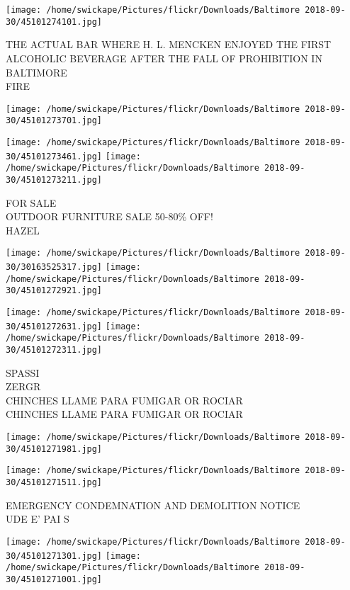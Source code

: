 \documentclass[10pt,letterpaper]{article}
\begin{document}
\vspace{0.25in}
\texttt{[image: /home/swickape/Pictures/flickr/Downloads/Baltimore 2018-09-30/45101274101.jpg]}

THE ACTUAL BAR WHERE H. L. MENCKEN ENJOYED THE FIRST ALCOHOLIC BEVERAGE AFTER THE FALL OF PROHIBITION IN BALTIMORE\\
FIRE\\
\pagebreak

\texttt{[image: /home/swickape/Pictures/flickr/Downloads/Baltimore 2018-09-30/45101273701.jpg]}

\vspace{0.25in}
\texttt{[image: /home/swickape/Pictures/flickr/Downloads/Baltimore 2018-09-30/45101273461.jpg]}
\texttt{[image: /home/swickape/Pictures/flickr/Downloads/Baltimore 2018-09-30/45101273211.jpg]}

FOR SALE\\
OUTDOOR FURNITURE SALE 50{-}80\% OFF!\\
HAZEL\\
\pagebreak

\texttt{[image: /home/swickape/Pictures/flickr/Downloads/Baltimore 2018-09-30/30163525317.jpg]}
\texttt{[image: /home/swickape/Pictures/flickr/Downloads/Baltimore 2018-09-30/45101272921.jpg]}

\texttt{[image: /home/swickape/Pictures/flickr/Downloads/Baltimore 2018-09-30/45101272631.jpg]}
\texttt{[image: /home/swickape/Pictures/flickr/Downloads/Baltimore 2018-09-30/45101272311.jpg]}

SPASSI\\
ZERGR\\
CHINCHES LLAME PARA FUMIGAR OR ROCIAR\\
CHINCHES LLAME PARA FUMIGAR OR ROCIAR\\
\pagebreak

\texttt{[image: /home/swickape/Pictures/flickr/Downloads/Baltimore 2018-09-30/45101271981.jpg]}

\vspace{0.25in}
\texttt{[image: /home/swickape/Pictures/flickr/Downloads/Baltimore 2018-09-30/45101271511.jpg]}

EMERGENCY CONDEMNATION AND DEMOLITION NOTICE\\
UDE E' PAI S\\
\pagebreak

\texttt{[image: /home/swickape/Pictures/flickr/Downloads/Baltimore 2018-09-30/45101271301.jpg]}
\texttt{[image: /home/swickape/Pictures/flickr/Downloads/Baltimore 2018-09-30/45101271001.jpg]}
\end{document}
